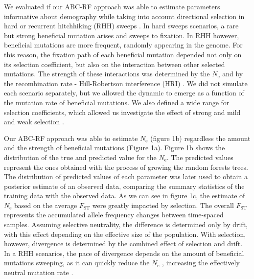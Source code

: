\documentclass[a4paper, 12pt]{article}
\begin{document}
We evaluated if our ABC-RF approach was able to estimate parameters informative about demography while taking into account directional selection in hard \citep{Smith:1974cy,Kaplan:1989tm,Barton:2000fg} or recurrent hitchhiking (RHH) sweeps \citep{Lange:2018fl,Wiehe:1993cm}. In hard sweeps scenarios, a rare but strong beneficial mutation arises and sweeps to fixation. In RHH however, beneficial mutations are more frequent, randomly appearing in the genome. For this reason, the fixation path of each beneficial mutation depended not only on its selection coefficient, but also on the interaction between other selected mutations. The strength of these interactions was determined by the $N_{\mathrm{e}}$ and by the recombination rate - Hill-Robertson interference (HRI) \citep{Hill:2007gx,Neher:2013ju}. We did not simulate each scenario separately, but we allowed the dynamic to emerge as a function of the mutation rate of beneficial mutations. We also defined a wide range for selection coefficients, which allowed us investigate the effect of strong \citep{Jensen:2008eo} and mild and weak selection \citep{Lange:2018fl}.  

Our ABC-RF approach was able to estimate $N_{\mathrm{e}}$ (figure 1b) regardless the amount and the strength of beneficial mutations (Figure 1a). Figure 1b shows the distribution of the true and predicted value for the $N_{\mathrm{e}}$. The predicted values represent the ones obtained with the process of growing the random forests trees. The distribution of predicted values of each parameter was later used to obtain a posterior estimate of an observed data, comparing the summary statistics of the training data with the observed data. As we can see in figure 1c, the estimate of $N_{\mathrm{e}}$ based on the average $F_{\mathrm{ST}}$ were greatly impacted by selection. The overall $F_{\mathrm{ST}}$ represents the accumulated allele frequency changes between time-spaced samples. Assuming selective neutrality, the difference is determined only by drift, with this effect depending on the effective size of the population. With selection, however, divergence is determined by the combined effect of selection and drift. In a RHH scenarios, the pace of divergence depends on the amount of beneficial mutations sweeping, as it can quickly reduce the $N_{\mathrm{e}}$ \citep{Lange:2018fl}, increasing the effectively neutral mutation rate \citep{Walsh:2018tv}.
\end{document}
